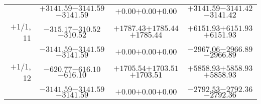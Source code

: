 \documentclass[compress]{beamer}
\begin{document}
\begin{frame}
{\begin{tabular}{r | c | c | c}
           & $+3141.59$\hspace{0.1 cm}$-3141.59$\hspace{0.1 cm}\textcolor{black}{$-3141.59$} & $+0.00$\hspace{0.1 cm}$+0.00$\hspace{0.1 cm}\textcolor{black}{$+0.00$} & $+3141.59$\hspace{0.1 cm}$-3141.42$\hspace{0.1 cm}\textcolor{black}{$-3141.42$} \\
$+$1/1, 11 & $-315.17$\hspace{0.1 cm}$-310.52$\hspace{0.1 cm}\textcolor{black}{$-310.52$} & $+1787.43$\hspace{0.1 cm}$+1785.44$\hspace{0.1 cm}\textcolor{black}{$+1785.44$} & $+6151.93$\hspace{0.1 cm}$+6151.93$\hspace{0.1 cm}\textcolor{black}{$+6151.93$} \\
           & $-3141.59$\hspace{0.1 cm}$-3141.59$\hspace{0.1 cm}\textcolor{black}{$-3141.59$} & $+0.00$\hspace{0.1 cm}$+0.00$\hspace{0.1 cm}\textcolor{black}{$+0.00$} & $-2967.06$\hspace{0.1 cm}$-2966.89$\hspace{0.1 cm}\textcolor{black}{$-2966.89$} \\
$+$1/1, 12 & $-620.77$\hspace{0.1 cm}$-616.10$\hspace{0.1 cm}\textcolor{black}{$-616.10$} & $+1705.54$\hspace{0.1 cm}$+1703.51$\hspace{0.1 cm}\textcolor{black}{$+1703.51$} & $+5858.93$\hspace{0.1 cm}$+5858.93$\hspace{0.1 cm}\textcolor{black}{$+5858.93$} \\
           & $-3141.59$\hspace{0.1 cm}$-3141.59$\hspace{0.1 cm}\textcolor{black}{$-3141.59$} & $+0.00$\hspace{0.1 cm}$+0.00$\hspace{0.1 cm}\textcolor{black}{$+0.00$} & $-2792.53$\hspace{0.1 cm}$-2792.36$\hspace{0.1 cm}\textcolor{black}{$-2792.36$} \\
\end{tabular}}
\end{frame}
\end{document}
